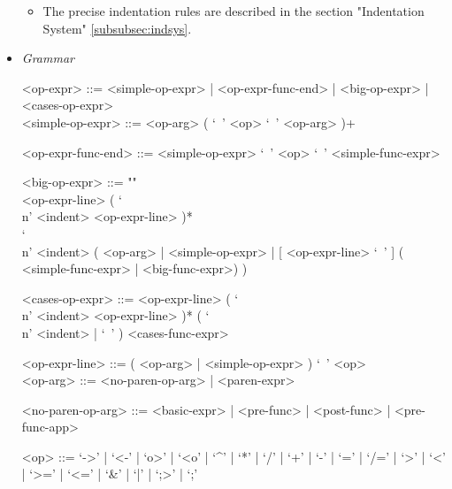 \documentclass{article}
\begin{document}
\begin{itemize}
\begin{itemize}
\item
The precise indentation rules are described in the section
"Indentation System" \ref{subsubsec:indsys}.
\end{itemize}

\item \textit{Grammar}
\begin{grammar}
<op-expr> ::=
<simple-op-expr> | <op-expr-func-end> | <big-op-expr> | <cases-op-expr>
\\

<simple-op-expr> ::=  <op-arg> ( `\ ' <op>  `\ ' <op-arg> )+

<op-expr-func-end> ::= <simple-op-expr> `\ '  <op> `\ ' <simple-func-expr>

<big-op-expr> ::= ""\\
<op-expr-line> ( `\\n' <indent> <op-expr-line> )* \\
`\\n' <indent>
( <op-arg> | <simple-op-expr> |
  [ <op-expr-line> `\ ' ] ( <simple-func-expr> | <big-func-expr>)
)

<cases-op-expr> ::=
<op-expr-line> ( `\\n' <indent> <op-expr-line> )*
( `\\n' <indent> | `\ ' ) <cases-func-expr> 

<op-expr-line> ::= ( <op-arg> | <simple-op-expr> ) `\ ' <op> 
\\

<op-arg> ::= <no-paren-op-arg> | <paren-expr>

<no-paren-op-arg> ::= <basic-expr> | <pre-func> | <post-func> | <pre-func-app>

<op> ::= 
`->' | `<-' | `o>' | `<o' | `^' | `*' | `/' | `+' | `-' |
`=' | `/=' | `>' | `<' | `>=' | `<=' | `\&' | `|' | `;>' | `;'\\
\end{grammar}
\end{itemize}
\end{document}
